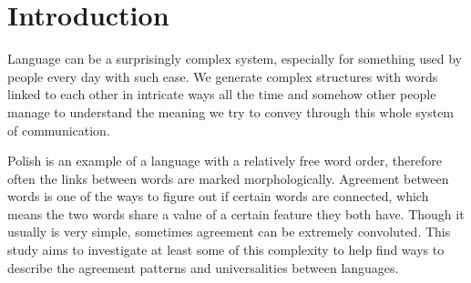 \chapter*{Introduction}\label{chap:Introduction}
\startcontents[chapters]

Language can be a surprisingly complex system, especially for something used by people every day with such ease. We generate complex structures with words linked to each other in intricate ways all the time and somehow other people manage to understand the meaning we try to convey through this whole system of communication.

Polish is an example of a language with a relatively free word order, therefore often the links between words are marked morphologically. Agreement between words is one of the ways to figure out if certain words are connected, which means the two words share a value of a certain feature they both have. Though it usually is very simple, sometimes agreement can be extremely convoluted. This study aims to investigate at least some of this complexity to help find ways to describe the agreement patterns and universalities between languages.
